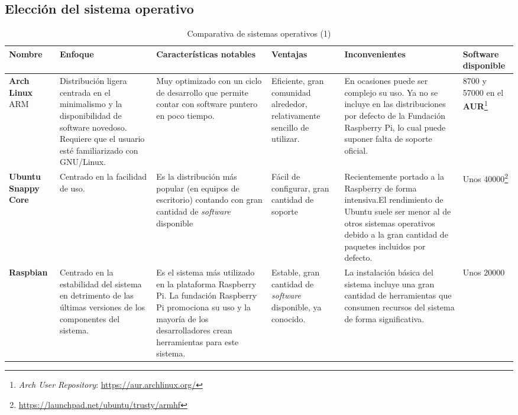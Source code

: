 \begin{landscape}
\subsection{Elección del sistema operativo}
\label{os:evaluation}
\begin{table}[h]
\begin{tabular}{|p{1.6cm}|p{5cm}|p{5cm}|p{3cm}|p{5cm}|p{2cm}|}
\hline
\textbf{Nombre} & \textbf{Enfoque} & \textbf{Características notables} & \textbf{Ventajas} & \textbf{Inconvenientes} & \textbf{Software disponible}\\ \hline
\textbf{Arch Linux} ARM & Distribución ligera centrada en el minimalismo y la disponibilidad de software novedoso. Requiere que el usuario esté familiarizado con GNU/Linux. & Muy optimizado con un ciclo de desarrollo que permite contar con software puntero en poco tiempo. & Eficiente, gran comunidad alrededor, relativamente sencillo de utilizar. & En ocasiones puede ser complejo su uso. Ya no se incluye en las distribuciones por defecto de la Fundación Raspberry Pi, lo cual puede suponer falta de soporte oficial. & 8700 y 57000 en el \textbf{AUR}\footnote{\textit{Arch User Repository}: \href{https://aur.archlinux.org/}{https://aur.archlinux.org/}}\\ \hline


\textbf{Ubuntu Snappy Core} & Centrado en la facilidad de uso. & Es la distribución más popular (en equipos de escritorio) contando con gran cantidad de \textit{software} disponible & Fácil de configurar, gran cantidad de soporte & Recientemente portado a la Raspberry de forma intensiva.El rendimiento de Ubuntu suele ser menor al de otros sistemas operativos debido a la gran cantidad de paquetes incluidos por defecto. & Unos 40000\footnote{\href{https://launchpad.net/ubuntu/trusty/armhf}{https://launchpad.net/ubuntu/trusty/armhf}}\\ \hline 

\textbf{Raspbian} & Centrado en la estabilidad del sistema en detrimento de las últimas versiones de los componentes del sistema. & Es el sistema más utilizado en la plataforma Raspberry Pi. La fundación Raspberry Pi promociona su uso y la mayoría de los desarrolladores crean herramientas para este sistema. & Estable, gran cantidad de \textit{software} disponible, ya conocido. & La instalación básica del sistema incluye una gran cantidad de herramientas que consumen recursos del sistema de forma significativa. & Unos 20000\\ \hline
\end{tabular}
\caption{Comparativa de sistemas operativos (1)}
\end{table}
\end{landscape}

